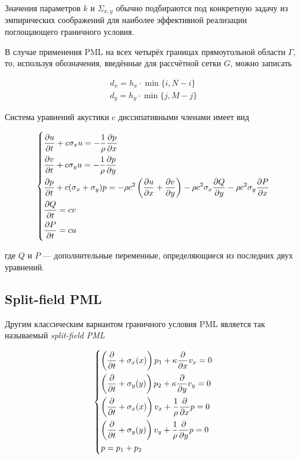 Значения параметров $k$ и $\Sigma_{x,y}$ обычно подбираются под конкретную задачу из эмпирических соображений для наиболее эффективной реализации поглощающего граничного условия.

В случае применения PML на всех четырёх границах прямоугольной области $\Gamma$, то, используя обозначения, введённые для рассчётной сетки $G$, можно записать
    
\begin{gather}
	d_x = h_x \cdot \min\{i, N - i\} \\
	d_y = h_y \cdot \min\{j, M - j\}  
\end{gather}
    
Система уравнений акустики c диссипативными членами имеет вид \cite{pml_from_maxwell}
    
\begin{equation}
	\begin{dcases}
		\frac{\partial u}{\partial t} + c\sigma_x u = -\frac{1}{\rho}\frac{\partial p}{\partial x} \\
		\frac{\partial v}{\partial t} + c\sigma_y u = -\frac{1}{\rho}\frac{\partial p}{\partial y} \\
	    \frac{\partial p}{\partial t} + c(\sigma_x + \sigma_y) p = -\rho c^2 \left(\frac{\partial u}{\partial x}+\frac{\partial v}{\partial y}\right) - \rho c^2 \sigma_x \frac{\partial Q}{\partial y} - \rho c^2 \sigma_y \frac{\partial P}{\partial x} \\
	    \frac{\partial Q}{\partial t} = cv \\
	    \frac{\partial P}{\partial t} = cu
	\end{dcases}\label{eq:pml} 
\end{equation}
    
где $Q$ и $P$ --- дополнительные переменные, определяющиеся из последних двух уравнений.
    
\subsection{Split-field PML}

Другим классическим вариантом граничного условия PML является так называемый \textit{split-field PML} \cite{aaaaaaaaaa}

\begin{equation}
	\begin{dcases}
	    \left(\frac{\partial}{\partial t} + \sigma_x(x)\right) p_1 + \kappa \frac{\partial}{\partial x} v_x = 0 \\
	    \left(\frac{\partial}{\partial t} + \sigma_y(y)\right) p_2 + \kappa \frac{\partial}{\partial y} v_y = 0 \\
	    \left(\frac{\partial}{\partial t} + \sigma_x(x)\right) v_x + \frac{1}{\rho} \frac{\partial}{\partial x} p = 0 \\
	    \left(\frac{\partial}{\partial t} + \sigma_y(y)\right) v_y + \frac{1}{\rho} \frac{\partial}{\partial y} p = 0 \\
	    p = p_1 + p_2
	\end{dcases}\label{eq:split_pml} 
\end{equation}
    
